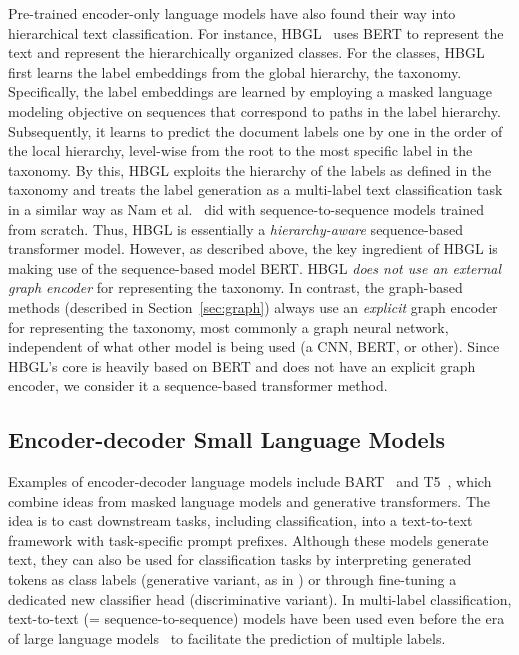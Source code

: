 \documentclass[lettersize,journal]{IEEEtran}
\begin{document}
Pre-trained encoder-only language models have also found their way into hierarchical text classification.
For instance, HBGL~\cite{hbgl} uses BERT to represent the text and represent the hierarchically organized classes.
For the classes, HBGL first learns the label embeddings from the global hierarchy, \ie the taxonomy.
Specifically, the label embeddings are learned by employing a masked language modeling objective on sequences that correspond to paths in the label hierarchy.
Subsequently, it learns to predict the document labels one by one in the order of the local hierarchy, \ie level-wise from the root to the most specific label in the taxonomy.
By this, HBGL exploits the hierarchy of the labels as defined in the taxonomy and treats the label generation as a multi-label text classification task in a similar way as Nam et al.~ \cite{namMaximizingSubsetAccuracy2017} did with sequence-to-sequence models trained from scratch.
Thus, HBGL is essentially a \textit{hierarchy-aware} sequence-based transformer model. 
However, as described above, the key ingredient of HBGL is making use of the sequence-based model BERT.
HBGL \textit{does not use an external graph encoder} for representing the taxonomy.
In contrast, the graph-based methods (described in Section~\ref{sec:graph}) always use an \textit{explicit} graph encoder for representing the taxonomy, most commonly a graph neural network, independent of what other model is being used (\eg a CNN, BERT, or other).
Since HBGL's core is heavily based on BERT and does not have an explicit graph encoder, we consider it a sequence-based transformer method.

\subsection{Encoder-decoder Small Language Models}
\label{sec:finetune-encdec-slms}

Examples of encoder-decoder language models include BART~\cite{lewis2020bart} and T5~\cite{T5}, which combine ideas from masked language models and generative transformers. 
The idea is to cast downstream tasks, including classification, into a text-to-text framework with task-specific prompt prefixes. 
Although these models generate text, they can also be used for classification tasks by interpreting generated tokens as class labels (generative variant, as in \cite{radar}) or through fine-tuning a dedicated new classifier head (discriminative variant).
In multi-label classification, text-to-text (= sequence-to-sequence) models have been used even before the era of large language models~\cite{namMaximizingSubsetAccuracy2017} to facilitate the prediction of multiple labels.
\end{document}
